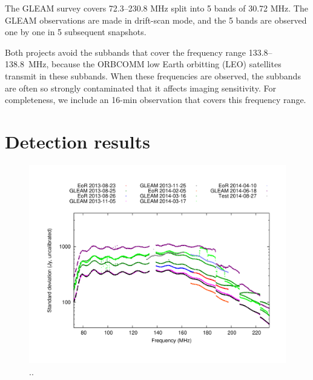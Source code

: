 \documentclass[useAMS,usenatbib]{mn2e}
\begin{document}
The GLEAM survey covers 72.3--230.8 MHz split into 5 bands of 30.72 MHz. The GLEAM observations are made in drift-scan mode, and the 5 bands are observed one by one in 5 subsequent snapshots.

Both projects avoid the subbands that cover the frequency range 133.8--138.8~MHz, because the ORBCOMM low Earth orbitting (LEO) satellites transmit in these subbands. When these frequencies are observed, the subbands are often so strongly contaminated that it affects imaging sensitivity. For completeness, we include an 16-min observation that covers this frequency range.

\section{Detection results}

\noindent\begin{figure}
\begin{center}\hspace*{-0.2cm}\includegraphics[width=18cm]{img/plot-stddev-per-set}\vspace{-1cm}
\caption{..}
\label{fig:stddev-per-set}
\end{center}
\end{figure}
\end{document}
